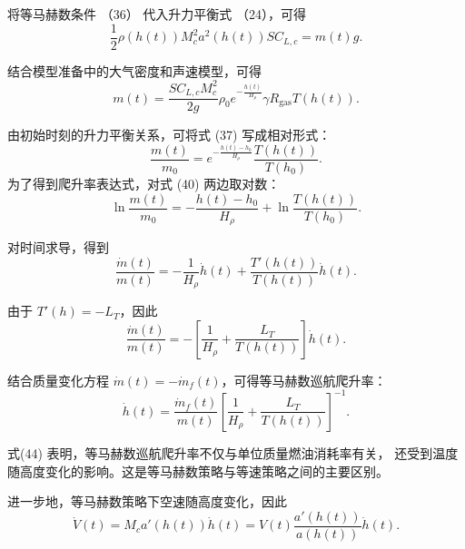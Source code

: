 \documentclass[withoutpreface,bwprint]{cumcmthesis} %
\begin{document}
将等马赫数条件 （36） 代入升力平衡式
（24），可得
\begin{equation}
    \frac{1}{2}
    \rho(h(t))
    M_c^2a^2(h(t))
    S C_{L,c}
    =
    m(t)g.
    \label{eq:constant_mach_lift_balance}
\end{equation}

结合模型准备中的大气密度和声速模型，可得
\begin{equation}
    m(t)
    =
    \frac{S C_{L,c}M_c^2}{2g}
    \rho_0 e^{-\frac{h(t)}{H_\rho}}
    \gamma R_{\mathrm{gas}}T(h(t)).
    \label{eq:constant_mach_m_h}
\end{equation}

由初始时刻的升力平衡关系，可将式 (37) 写成相对形式：
\begin{equation}
    \frac{m(t)}{m_0}
    =
    e^{-\frac{h(t)-h_0}{H_\rho}}
    \frac{T(h(t))}{T(h_0)}.
    \label{eq:constant_mach_relative}
\end{equation}
为了得到爬升率表达式，对式 (40) 两边取对数：
\begin{equation}
    \ln\frac{m(t)}{m_0}
    =
    -\frac{h(t)-h_0}{H_\rho}
    +
    \ln\frac{T(h(t))}{T(h_0)}.
    \label{eq:constant_mach_log}
\end{equation}

对时间求导，得到
\begin{equation}
    \frac{\dot m(t)}{m(t)}
    =
    -\frac{1}{H_\rho}\dot h(t)
    +
    \frac{T'(h(t))}{T(h(t))}\dot h(t).
    \label{eq:constant_mach_derivative}
\end{equation}

由于 $T'(h)=-L_T$，因此
\begin{equation}
    \frac{\dot m(t)}{m(t)}
    =
    -
    \left[
    \frac{1}{H_\rho}
    +
    \frac{L_T}{T(h(t))}
    \right]
    \dot h(t).
    \label{eq:constant_mach_mdot}
\end{equation}

结合质量变化方程 $\dot m(t)=-\dot m_f(t)$，可得等马赫数巡航爬升率：
\begin{equation}
    \dot h(t)
    =
    \frac{\dot m_f(t)}{m(t)}
    \left[
    \frac{1}{H_\rho}
    +
    \frac{L_T}{T(h(t))}
    \right]^{-1}.
    \label{eq:constant_mach_h_dot}
\end{equation}

式(44) 表明，等马赫数巡航爬升率不仅与单位质量燃油消耗率有关，
还受到温度随高度变化的影响。这是等马赫数策略与等速策略之间的主要区别。

进一步地，等马赫数策略下空速随高度变化，因此
\begin{equation}
    \dot V(t)
    =
    M_c a'(h(t))\dot h(t)
    =
    V(t)\frac{a'(h(t))}{a(h(t))}\dot h(t).
    \label{eq:constant_mach_Vdot}
\end{equation}
\end{document}
